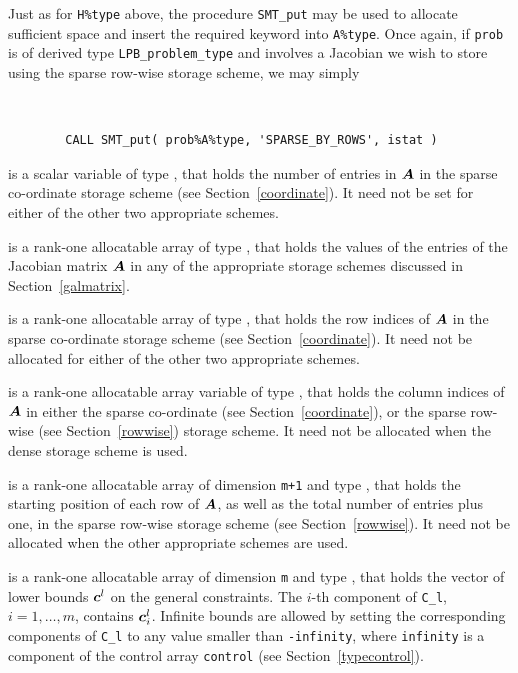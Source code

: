\documentclass{galahad}
\newcommand{\packagename}{LPB}
\begin{document}
\begin{description}
\begin{description}
Just as for {\tt H\%type} above, the procedure {\tt SMT\_put}
may be used to allocate sufficient space and insert the required keyword
into {\tt A\%type}.
Once again, if {\tt prob} is of derived type {\tt \packagename\_problem\_type}
and involves a Jacobian we wish to store using the sparse row-wise
storage scheme, we may simply
{\tt
\begin{verbatim}
        CALL SMT_put( prob%A%type, 'SPARSE_BY_ROWS', istat )
\end{verbatim}
}
\noindent

 is a scalar variable of type \integer, that
holds the number of entries in ${\bm{A}}$
in the sparse co-ordinate storage scheme (see Section~\ref{coordinate}).
It need not be set for either of the other two appropriate schemes.

 is a rank-one allocatable array of type \realdp, that holds
the values of the entries of the Jacobian matrix ${\bm{A}}$ in any of the
appropriate storage schemes discussed in Section~\ref{galmatrix}.

 is a rank-one allocatable array of type \integer,
that holds the row indices of ${\bm{A}}$ in the sparse co-ordinate storage
scheme (see Section~\ref{coordinate}).
It need not be allocated for either of the other two appropriate schemes.

 is a rank-one allocatable array variable of type \integer,
that holds the column indices of ${\bm{A}}$ in either the sparse co-ordinate
(see Section~\ref{coordinate}), or the sparse row-wise
(see Section~\ref{rowwise}) storage scheme.
It need not be allocated when the dense storage scheme is used.

 is a rank-one allocatable array of dimension {\tt m+1} and type
\integer, that holds the
starting position of each row of ${\bm{A}}$, as well
as the total number of entries plus one, in the sparse row-wise storage
scheme (see Section~\ref{rowwise}). It need not be allocated when the
other appropriate schemes are used.

\end{description}

 is a rank-one allocatable array of dimension {\tt m} and type
\realdp, that holds the vector of lower bounds ${\bm{c}}^{l}$
on the general constraints. The $i$-th component of
{\tt C\_l}, $i = 1, \ldots , m$, contains ${\bm{c}}_{i}^{l}$.
Infinite bounds are allowed by setting the corresponding
components of {\tt C\_l} to any value smaller than {\tt -infinity},
where {\tt infinity} is a component of the control array {\tt control}
(see Section~\ref{typecontrol}).


\end{description}
\end{document}
